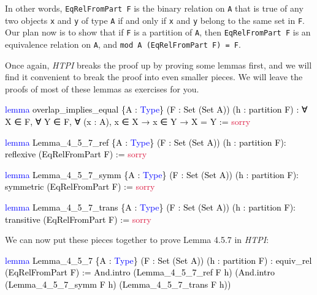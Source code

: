\documentclass[
  letterpaper,
  DIV=11,
  numbers=noendperiod]{scrreprt}
\newenvironment{Shaded}{\begin{snugshade}}{\end{snugshade}}
\newcommand{\ConstantTok}[1]{\textcolor[rgb]{0.56,0.35,0.01}{#1}}
\newcommand{\KeywordTok}[1]{\textcolor[rgb]{0.00,0.23,0.31}{#1}}
\newcommand{\NormalTok}[1]{\textcolor[rgb]{0.00,0.23,0.31}{#1}}
\renewcommand{\NormalTok}[1]{\textcolor[HTML]{000000}{#1}}
\renewcommand{\KeywordTok}[1]{\textcolor[HTML]{0000FF}{#1}}
\renewcommand{\ConstantTok}[1]{\textcolor[HTML]{DC143C}{#1}}
\theoremstyle{remark}
\begin{document}
In other words, \texttt{EqRelFromPart\ F} is the binary relation on
\texttt{A} that is true of any two objects \texttt{x} and \texttt{y} of
type \texttt{A} if and only if \texttt{x} and \texttt{y} belong to the
same set in \texttt{F}. Our plan now is to show that if \texttt{F} is a
partition of \texttt{A}, then \texttt{EqRelFromPart\ F} is an
equivalence relation on \texttt{A}, and
\texttt{mod\ A\ (EqRelFromPart\ F)\ =\ F}.

Once again, \emph{HTPI} breaks the proof up by proving some lemmas
first, and we will find it convenient to break the proof into even
smaller pieces. We will leave the proofs of most of these lemmas as
exercises for you.

\begin{Shaded}
\begin{Highlighting}[]
\KeywordTok{lemma}\NormalTok{ overlap\_implies\_equal \{A : }\KeywordTok{Type}\NormalTok{\}}
\NormalTok{    (F : Set (Set A)) (h : partition F) :}
\NormalTok{    ∀ X ∈ F, ∀ Y ∈ F, ∀ (x : A), x ∈ X → x ∈ Y → X = Y := }\ConstantTok{sorry}

\KeywordTok{lemma}\NormalTok{ Lemma\_4\_5\_7\_ref \{A : }\KeywordTok{Type}\NormalTok{\} (F : Set (Set A)) (h : partition F):}
\NormalTok{    reflexive (EqRelFromPart F) := }\ConstantTok{sorry}
  
\KeywordTok{lemma}\NormalTok{ Lemma\_4\_5\_7\_symm \{A : }\KeywordTok{Type}\NormalTok{\} (F : Set (Set A)) (h : partition F):}
\NormalTok{    symmetric (EqRelFromPart F) := }\ConstantTok{sorry}

\KeywordTok{lemma}\NormalTok{ Lemma\_4\_5\_7\_trans \{A : }\KeywordTok{Type}\NormalTok{\} (F : Set (Set A)) (h : partition F):}
\NormalTok{    transitive (EqRelFromPart F) := }\ConstantTok{sorry}
\end{Highlighting}
\end{Shaded}

We can now put these pieces together to prove Lemma 4.5.7 in
\emph{HTPI}:

\begin{Shaded}
\begin{Highlighting}[]
\KeywordTok{lemma}\NormalTok{ Lemma\_4\_5\_7 \{A : }\KeywordTok{Type}\NormalTok{\} (F : Set (Set A)) (h : partition F) :}
\NormalTok{    equiv\_rel (EqRelFromPart F) := And.intro (Lemma\_4\_5\_7\_ref F h)}
\NormalTok{      (And.intro (Lemma\_4\_5\_7\_symm F h) (Lemma\_4\_5\_7\_trans F h))}
\end{Highlighting}
\end{Shaded}
\end{document}

